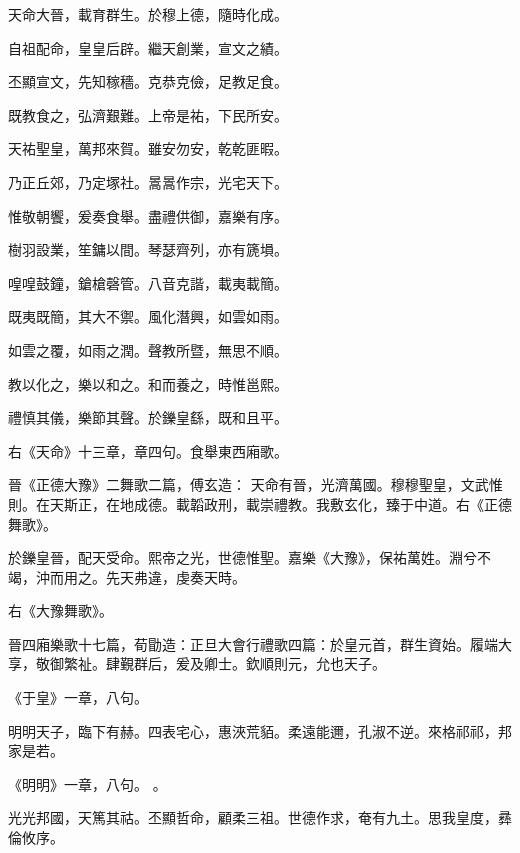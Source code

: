 \begin{pinyinscope}
天命大晉，載育群生。於穆上德，隨時化成。


自祖配命，皇皇后辟。繼天創業，宣文之績。


丕顯宣文，先知稼穡。克恭克儉，足教足食。


既教食之，弘濟艱難。上帝是祐，下民所安。


天祐聖皇，萬邦來賀。雖安勿安，乾乾匪暇。


乃正丘郊，乃定塚社。暠暠作宗，光宅天下。


惟敬朝饗，爰奏食舉。盡禮供御，嘉樂有序。


樹羽設業，笙鏞以間。琴瑟齊列，亦有篪塤。


喤喤鼓鐘，鎗槍磬管。八音克諧，載夷載簡。


既夷既簡，其大不禦。風化潛興，如雲如雨。


如雲之覆，如雨之潤。聲教所暨，無思不順。


教以化之，樂以和之。和而養之，時惟邕熙。


禮慎其儀，樂節其聲。於鑠皇繇，既和且平。



 右《天命》十三章，章四句。食舉東西廂歌。



 晉《正德大豫》二舞歌二篇，傅玄造：
 天命有晉，光濟萬國。穆穆聖皇，文武惟則。在天斯正，在地成德。載韜政刑，載崇禮教。我敷玄化，臻于中道。右《正德舞歌》。



 於鑠皇晉，配天受命。熙帝之光，世德惟聖。嘉樂《大豫》，保祐萬姓。淵兮不竭，沖而用之。先天弗違，虔奏天時。



 右《大豫舞歌》。



 晉四廂樂歌十七篇，荀勖造：正旦大會行禮歌四篇：於皇元首，群生資始。履端大享，敬御繁祉。肆覲群后，爰及卿士。欽順則元，允也天子。


《于皇》一章，八句。



 明明天子，臨下有赫。四表宅心，惠浹荒貊。柔遠能邇，孔淑不逆。來格祁祁，邦家是若。


《明明》一章，八句。
 。



 光光邦國，天篤其祜。丕顯哲命，顧柔三祖。世德作求，奄有九土。思我皇度，彞倫攸序。



\end{pinyinscope}
